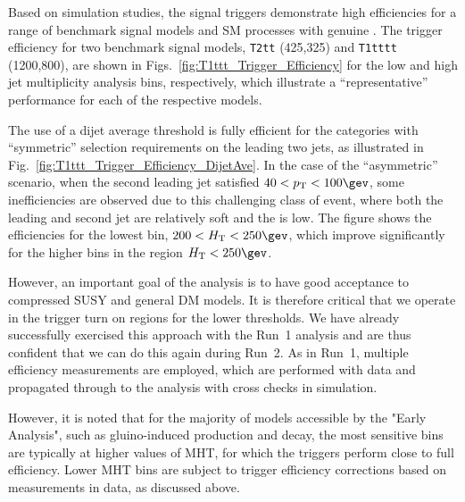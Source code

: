 Based on simulation studies, the signal triggers demonstrate high
efficiencies for a range of benchmark signal models and SM processes
with genuine \met. The trigger efficiency for two benchmark signal
models, \texttt{T2tt} (425,325) and \texttt{T1tttt} (1200,800), are
shown in Figs.~\ref{fig:T1ttt_Trigger_Efficiency} for the low and
high jet multiplicity analysis bins, respectively, which illustrate a
``representative'' performance for each of the respective models.
  
The use of a dijet average threshold is fully efficient for the
categories with ``symmetric'' \Pt selection requirements on the
leading two jets, as illustrated in
Fig.~\ref{fig:T1ttt_Trigger_Efficiency_DijetAve}. In the case of the
``asymmetric'' scenario, when the second leading jet satisfied $40 <
\Pt < 100\gev$, some inefficiencies are observed due to this
challenging class of event, where both the leading and second jet
are relatively soft and the \scalht is low. The figure shows the
efficiencies for the lowest \scalht bin, $200 < \scalht < 250\gev$, 
which improve significantly for the higher \scalht bins in the region
$\scalht < 250\gev$. 

However, an important goal of the analysis is to have good acceptance
to compressed SUSY and general DM models. It is therefore critical
that we operate in the trigger turn on regions for the lower
thresholds. We have already successfully exercised this approach with
the Run~1 analysis and are thus confident that we can do this again
during Run~2. As in Run~1, multiple efficiency measurements are
employed, which are performed with data and propagated through to the
analysis with cross checks in simulation.

However, it is noted that for the majority of models accessible by the
"Early Analysis", such as gluino-induced production and decay, the
most sensitive bins are typically at higher values of MHT, for which
the triggers perform close to full efficiency. Lower MHT bins are
subject to trigger efficiency corrections based on measurements in
data, as discussed above. 


